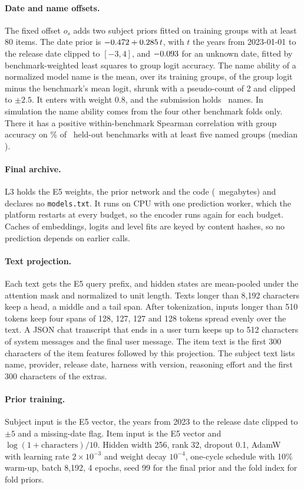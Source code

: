 \documentclass{article}
\begin{document}
\paragraph{Date and name offsets.} The fixed offset $o_s$ adds two subject priors fitted on training groups with at least 80 items. The date prior is $-0.472 + 0.285\,t$, with $t$ the years from 2023-01-01 to the release date clipped to $[-3,4]$, and $-0.093$ for an unknown date, fitted by benchmark-weighted least squares to group logit accuracy. The name ability of a normalized model name is the mean, over its training groups, of the group logit minus the benchmark's mean logit, shrunk with a pseudo-count of 2 and clipped to $\pm2.5$. It enters with weight 0.8, and the submission holds \NameCount\ names. In simulation the name ability comes from the four other benchmark folds only. There it has a positive within-benchmark Spearman correlation with group accuracy on \NamePos\% of \NameBench\ held-out benchmarks with at least five named groups (median \NameMedian).

\paragraph{Final archive.} L3 holds the E5 weights, the prior network and the code (\ArchiveFinalMB\ megabytes) and declares no \texttt{models.txt}. It runs on CPU with one prediction worker, which the platform restarts at every budget, so the encoder runs again for each budget. Caches of embeddings, logits and level fits are keyed by content hashes, so no prediction depends on earlier calls.

\paragraph{Text projection.} Each text gets the E5 query prefix, and hidden states are mean-pooled under the attention mask and normalized to unit length. Texts longer than 8,192 characters keep a head, a middle and a tail span. After tokenization, inputs longer than 510 tokens keep four spans of 128, 127, 127 and 128 tokens spread evenly over the text. A JSON chat transcript that ends in a user turn keeps up to 512 characters of system messages and the final user message. The item text is the first 300 characters of the item features followed by this projection. The subject text lists name, provider, release date, harness with version, reasoning effort and the first 300 characters of the extras.
\paragraph{Prior training.} Subject input is the E5 vector, the years from 2023 to the release date clipped to $\pm5$ and a missing-date flag. Item input is the E5 vector and $\log(1+\text{characters})/10$. Hidden width 256, rank 32, dropout 0.1, AdamW~\citep{adamw} with learning rate $2\times10^{-3}$ and weight decay $10^{-4}$, one-cycle schedule with 10\% warm-up, batch 8,192, 4 epochs, seed 99 for the final prior and the fold index for fold priors.
\end{document}
